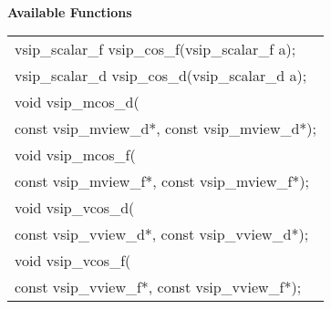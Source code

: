 \\\cvsiplh
\newline \hspace*{.8cm} \vspace*{.1cm} \textbf{Available Functions }
\newline \hspace*{1.1cm} {
\ttfamily
\begin{tabular}[H]{l}
vsip\_scalar\_f vsip\_cos\_f(vsip\_scalar\_f a);\\
vsip\_scalar\_d vsip\_cos\_d(vsip\_scalar\_d a);\\
void vsip\_mcos\_d(\\*
\hspace{1cm}const vsip\_mview\_d*, const vsip\_mview\_d*);\\
void vsip\_mcos\_f(\\*
\hspace{1cm}const vsip\_mview\_f*, const vsip\_mview\_f*);\\
void vsip\_vcos\_d(\\*
\hspace{1cm}const vsip\_vview\_d*, const vsip\_vview\_d*);\\
void vsip\_vcos\_f(\\*
\hspace{1cm}const vsip\_vview\_f*, const vsip\_vview\_f*);\\
\end{tabular}
}
\\\pyjvsiph
{}
